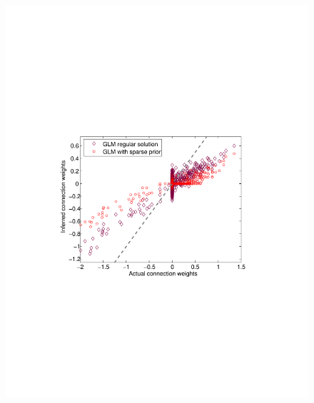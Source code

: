 \begin{figure}
\centering
\begin{minipage}[c]{0.45\hsize}
\includegraphics[width=\hsize]{../figs/Figure9_fluor_sparse_sol}
\end{minipage}
\begin{minipage}[c]{0.45\hsize}

\end{minipage}
\end{figure}
